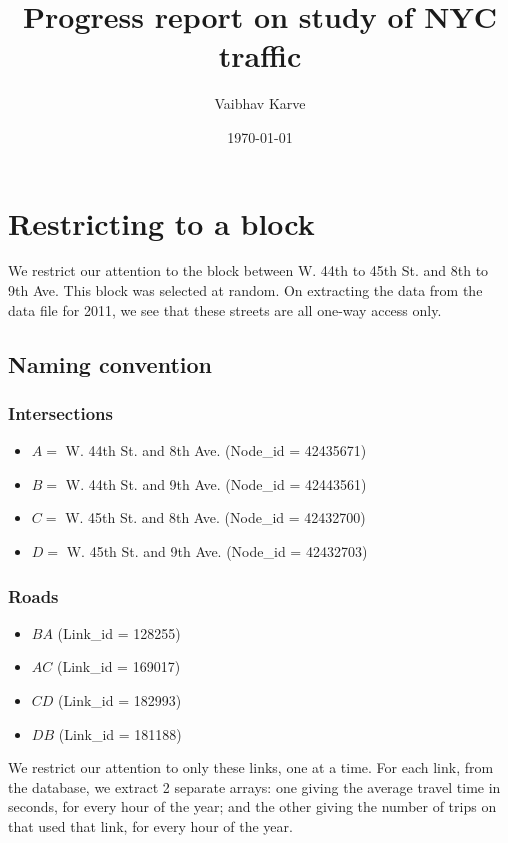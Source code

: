 \documentclass[10pt,a4paper]{amsart}
\author{Vaibhav Karve}
\title{Progress report on study of NYC traffic}
\begin{document}
\date{\today}
\maketitle

\section{Restricting to a block}
We restrict our attention to the block between W. 44th to 45th St. and
8th to 9th Ave. This block was selected at random. On extracting the
data from the data file for 2011, we see that these streets are all one-way
access only.

\subsection{Naming convention}
\subsubsection{Intersections}
	\begin{itemize}
		\item \(A=\) W. 44th St. and 8th Ave. (Node\_id = 42435671)
		\item \(B=\) W. 44th St. and 9th Ave. (Node\_id = 42443561)
		\item \(C=\) W. 45th St. and 8th Ave. (Node\_id = 42432700)
		\item \(D=\) W. 45th St. and 9th Ave. (Node\_id = 42432703)
	\end{itemize}

\subsubsection{Roads}
	\begin{itemize}
		\item \(BA\) (Link\_id = 128255)
		\item \(AC\) (Link\_id = 169017)
		\item \(CD\) (Link\_id = 182993)
		\item \(DB\) (Link\_id = 181188)
	\end{itemize}
		
We restrict our attention to only these links, one at a time. For each
link, from the database, we extract 2 separate arrays: one giving the
average travel time in seconds, for every hour of the year; and the other
giving the number of trips on that used that link, for every hour of the
year.
\end{document}
